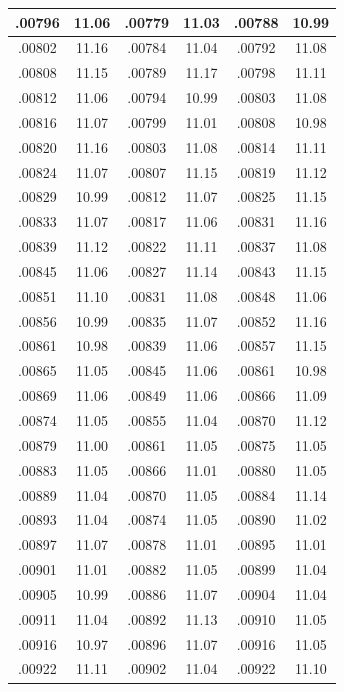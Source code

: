 \documentclass[11pt]{report}
\begin{document}
\begin{appendices}
\begin{longtable}{|c|c||c|c||c|c|}
.00796 & 11.06 & .00779 & 11.03 & .00788 & 10.99\\\hline
.00802 & 11.16 & .00784 & 11.04 & .00792 & 11.08\\\hline
.00808 & 11.15 & .00789 & 11.17 & .00798 & 11.11\\\hline
.00812 & 11.06 & .00794 & 10.99 & .00803 & 11.08\\\hline
.00816 & 11.07 & .00799 & 11.01 & .00808 & 10.98\\\hline
.00820 & 11.16 & .00803 & 11.08 & .00814 & 11.11\\\hline
.00824 & 11.07 & .00807 & 11.15 & .00819 & 11.12\\\hline
.00829 & 10.99 & .00812 & 11.07 & .00825 & 11.15\\\hline
.00833 & 11.07 & .00817 & 11.06 & .00831 & 11.16\\\hline
.00839 & 11.12 & .00822 & 11.11 & .00837 & 11.08\\\hline
.00845 & 11.06 & .00827 & 11.14 & .00843 & 11.15\\\hline
.00851 & 11.10 & .00831 & 11.08 & .00848 & 11.06\\\hline
.00856 & 10.99 & .00835 & 11.07 & .00852 & 11.16\\\hline
.00861 & 10.98 & .00839 & 11.06 & .00857 & 11.15\\\hline
.00865 & 11.05 & .00845 & 11.06 & .00861 & 10.98\\\hline
.00869 & 11.06 & .00849 & 11.06 & .00866 & 11.09\\\hline
.00874 & 11.05 & .00855 & 11.04 & .00870 & 11.12\\\hline
.00879 & 11.00 & .00861 & 11.05 & .00875 & 11.05\\\hline
.00883 & 11.05 & .00866 & 11.01 & .00880 & 11.05\\\hline
.00889 & 11.04 & .00870 & 11.05 & .00884 & 11.14\\\hline
.00893 & 11.04 & .00874 & 11.05 & .00890 & 11.02\\\hline
.00897 & 11.07 & .00878 & 11.01 & .00895 & 11.01\\\hline
.00901 & 11.01 & .00882 & 11.05 & .00899 & 11.04\\\hline
.00905 & 10.99 & .00886 & 11.07 & .00904 & 11.04\\\hline
.00911 & 11.04 & .00892 & 11.13 & .00910 & 11.05\\\hline
.00916 & 10.97 & .00896 & 11.07 & .00916 & 11.05\\\hline
.00922 & 11.11 & .00902 & 11.04 & .00922 & 11.10\\\hline

\end{longtable}
\end{appendices}
\end{document}
